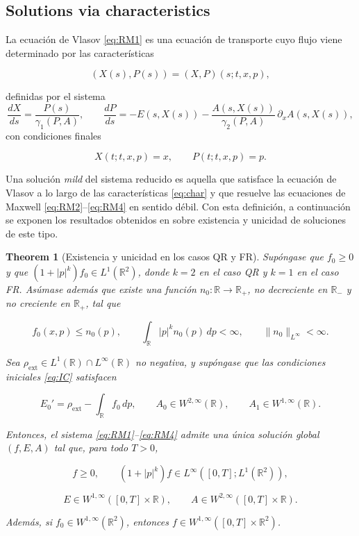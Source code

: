 \documentclass[11pt,a4paper,twoside,pdf]{article}
\numberwithin{equation}{section}
\newtheorem{theorem}{Theorem}[section]
\begin{document}
\subsection{Solutions via characteristics}

La ecuación de Vlasov \eqref{eq:RM1} es una ecuación de transporte cuyo flujo viene
determinado por las características \cite{romeroedp}


\[
(X(s),P(s)) = (X,P)(s;t,x,p),
\]


definidas por el sistema
\begin{equation}
\frac{dX}{ds} = \frac{P(s)}{\gamma_1(P,A)}, \qquad
\frac{dP}{ds} = -E(s,X(s)) - \frac{A(s,X(s))}{\gamma_2(P,A)}\,\partial_x A(s,X(s)),
\label{eq:char}
\end{equation}
con condiciones finales


\[
X(t;t,x,p)=x, \qquad P(t;t,x,p)=p.
\]



Una solución \emph{mild} del sistema reducido es aquella que satisface la ecuación de
Vlasov a lo largo de las características \eqref{eq:char} y que resuelve las ecuaciones
de Maxwell \eqref{eq:RM2}--\eqref{eq:RM4} en sentido débil. Con esta definición, a continuación se exponen los resultados obtenidos en \cite{bostan2007mild} sobre existencia y unicidad de soluciones de este tipo.



\begin{theorem}[Existencia y unicidad en los casos QR y FR]
Supóngase que $f_0\ge 0$ y que $(1+|p|^k)f_0\in L^1(\mathbb{R}^2)$, donde
$k=2$ en el caso QR y $k=1$ en el caso FR. Asúmase además que existe una función
$n_0:\mathbb{R}\to\mathbb{R}_+$, no decreciente en $\mathbb{R}_-$ y no creciente en
$\mathbb{R}_+$, tal que


\[
f_0(x,p)\le n_0(p), \qquad
\int_{\mathbb{R}} |p|^k n_0(p)\,dp <\infty, \qquad
\|n_0\|_{L^\infty}<\infty.
\]



Sea $\rho_{\mathrm{ext}}\in L^1(\mathbb{R})\cap L^\infty(\mathbb{R})$ no negativa, y supóngase
que las condiciones iniciales \eqref{eq:IC} satisfacen


\[
E_0' = \rho_{\mathrm{ext}} - \int_{\mathbb{R}} f_0\,dp, \qquad
A_0\in W^{2,\infty}(\mathbb{R}), \qquad
A_1\in W^{1,\infty}(\mathbb{R}).
\]



Entonces, el sistema \eqref{eq:RM1}--\eqref{eq:RM4} admite una única solución global
$(f,E,A)$ tal que, para todo $T>0$,


\[
f\ge 0, \qquad
(1+|p|^k)f \in L^\infty([0,T];L^1(\mathbb{R}^2)),
\]




\[
E\in W^{1,\infty}([0,T]\times\mathbb{R}), \qquad
A\in W^{2,\infty}([0,T]\times\mathbb{R}).
\]


Además, si $f_0\in W^{1,\infty}(\mathbb{R}^2)$, entonces $f\in W^{1,\infty}([0,T]\times\mathbb{R}^2)$.
\end{theorem}
\end{document}
